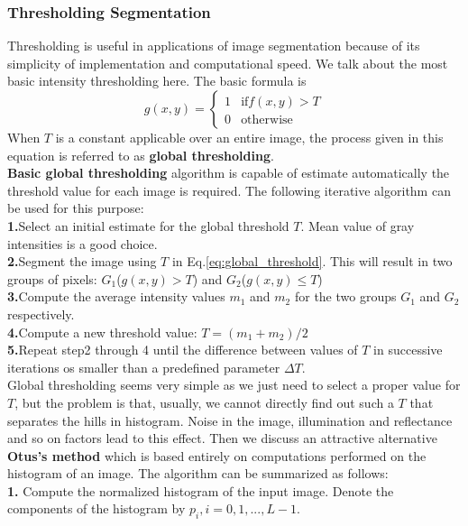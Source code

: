 \subsubsection{Thresholding Segmentation}
Thresholding is useful in applications of image segmentation because of its simplicity of implementation and computational speed. We talk about the most basic intensity thresholding here. The basic formula is 
\begin{equation}g(x,y)=\left \{ \begin{array}{rcl}
1 & \text{if}f(x,y)>T \\
0 & \text{otherwise}  \end{array} \right.\label{eq:global_threshold}\end{equation}
When $T$ is a constant applicable over an entire image, the process given in this equation is referred to as \textbf{global thresholding}. \\
\textbf{Basic global thresholding} algorithm is capable of estimate automatically the threshold value for each image is required. The following iterative algorithm can be used for this purpose:\\
\textbf{1.}Select an initial estimate for the global threshold $T$. Mean value of gray intensities is a good choice.\\
\textbf{2.}Segment the image using $T$ in Eq.\ref{eq:global_threshold}. This will result in two groups of pixels: $G_1$($g(x,y)>T$) and $G_2$($g(x,y)\leq T$)\\
\textbf{3.}Compute the average intensity values $m_1$ and $m_2$ for the two groups $G_1$ and $G_2$ respectively.\\
\textbf{4.}Compute a new threshold value: $T=(m_1+m_2)/2$\\
\textbf{5.}Repeat step2 through 4 until the difference between values of $T$ in successive iterations os smaller than a predefined parameter $\Delta T$.\\
Global thresholding seems very simple as we just need to select a proper value for $T$, but the problem is that, usually, we cannot directly find out such a $T$ that separates the hills in histogram. Noise in the image, illumination and reflectance and so on factors lead to this effect.
Then we discuss an attractive alternative \textbf{Otus's method} which is based entirely on computations performed on the histogram of an image. The algorithm can be summarized as follows:\\
\textbf{1.} Compute the normalized histogram of the input image. Denote the components of the histogram by $p_i, i=0,1,...,L-1$.\\
